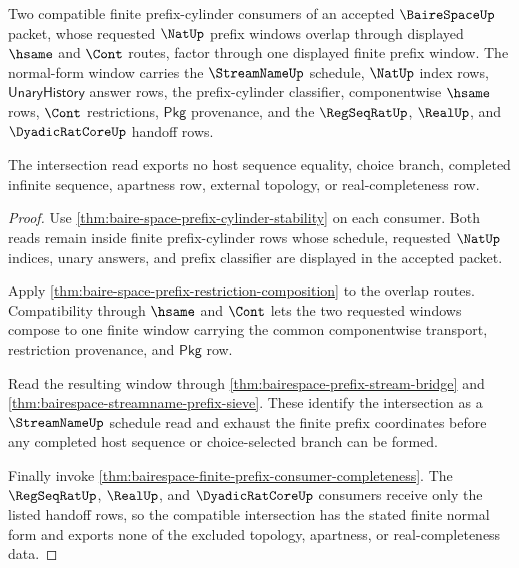 \begin{theorem}
\label{thm:bairespace-prefix-intersection-normal-form}
Two compatible finite prefix-cylinder consumers of an accepted
$\BaireSpaceUp$ packet, whose requested $\NatUp$ prefix windows overlap through
displayed $\hsame$ and $\Cont$ routes, factor through one displayed finite
prefix window. The normal-form window carries the $\StreamNameUp$ schedule,
$\NatUp$ index rows, $\mathsf{UnaryHistory}$ answer rows, the prefix-cylinder
classifier, componentwise $\hsame$ rows, $\Cont$ restrictions, $\mathsf{Pkg}$
provenance, and the $\RegSeqRatUp$, $\RealUp$, and $\DyadicRatCoreUp$ handoff
rows.

The intersection read exports no host sequence equality, choice branch,
completed infinite sequence, apartness row, external topology, or
real-completeness row.
\end{theorem}
\begin{proof}
Use \autoref{thm:baire-space-prefix-cylinder-stability} on each consumer. Both
reads remain inside finite prefix-cylinder rows whose schedule, requested
$\NatUp$ indices, unary answers, and prefix classifier are displayed in the
accepted packet.

Apply \autoref{thm:baire-space-prefix-restriction-composition} to the overlap
routes. Compatibility through $\hsame$ and $\Cont$ lets the two requested
windows compose to one finite window carrying the common componentwise
transport, restriction provenance, and $\mathsf{Pkg}$ row.

Read the resulting window through
\autoref{thm:bairespace-prefix-stream-bridge} and
\autoref{thm:bairespace-streamname-prefix-sieve}. These identify the
intersection as a $\StreamNameUp$ schedule read and exhaust the finite prefix
coordinates before any completed host sequence or choice-selected branch can be
formed.

Finally invoke
\autoref{thm:bairespace-finite-prefix-consumer-completeness}. The
$\RegSeqRatUp$, $\RealUp$, and $\DyadicRatCoreUp$ consumers receive only the
listed handoff rows, so the compatible intersection has the stated finite
normal form and exports none of the excluded topology, apartness, or
real-completeness data.
\end{proof}

